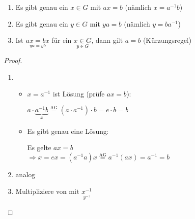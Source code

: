 	{\renewcommand{\labelenumi}{(\roman{enumi})}
	\begin{enumerate}
		\item
		Es gibt genau ein $x \in G$ mit $ax = b$ (nämlich $x = a^{-1}b$)
		\item
		Es gibt genau ein $y \in G$ mit $ya = b$ (nämlich $y=ba^{-1}$)
		\item
		Ist $\underset{ya=yb}{ax=bx}$ für ein $\underset{y \in G}{x \in G}$, dann gilt $a=b$ (Kürzungsregel)
	\end{enumerate}
	
	\begin{proof}
	\begin{enumerate}
		\item
		\begin{itemize}
			\item
			$x=a^{-1}$ ist Lösung (prüfe $ax=b$):
			
			$a \cdot \underbrace{a^{-1}b}_{x} \stackrel{\text{AG}}{=}(a \cdot a^{-1}) \cdot b = e \cdot b = b$
			
			\item Es gibt genau eine Lösung:
			
			Es gelte $ax=b$
			\\ $\Rightarrow x = ex = (a^{-1}a)x\stackrel{\text{AG}}{=}a^{-1}(ax) = a^{-1}= b$
		\end{itemize}
		
		\item
		analog
		
		\item
		Multipliziere von  mit $\underset{y^{-1}}{x^{-1}}$
	\end{enumerate}
	\end{proof}
	
	
	}
























